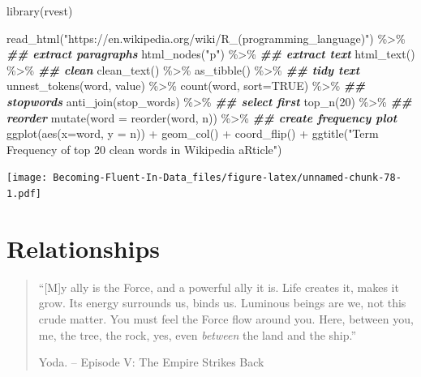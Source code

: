 \documentclass[
]{book}
\newenvironment{Shaded}{\begin{snugshade}}{\end{snugshade}}
\newcommand{\AttributeTok}[1]{\textcolor[rgb]{0.77,0.63,0.00}{#1}}
\newcommand{\ConstantTok}[1]{\textcolor[rgb]{0.00,0.00,0.00}{#1}}
\newcommand{\DecValTok}[1]{\textcolor[rgb]{0.00,0.00,0.81}{#1}}
\newcommand{\DocumentationTok}[1]{\textcolor[rgb]{0.56,0.35,0.01}{\textbf{\textit{#1}}}}
\newcommand{\FunctionTok}[1]{\textcolor[rgb]{0.00,0.00,0.00}{#1}}
\newcommand{\NormalTok}[1]{#1}
\newcommand{\SpecialCharTok}[1]{\textcolor[rgb]{0.00,0.00,0.00}{#1}}
\newcommand{\StringTok}[1]{\textcolor[rgb]{0.31,0.60,0.02}{#1}}
\begin{document}
\begin{Shaded}
\begin{Highlighting}[]
\FunctionTok{library}\NormalTok{(rvest)}

\FunctionTok{read\_html}\NormalTok{(}\StringTok{"https://en.wikipedia.org/wiki/R\_(programming\_language)"}\NormalTok{) }\SpecialCharTok{\%\textgreater{}\%}
  \DocumentationTok{\#\# extract paragraphs}
  \FunctionTok{html\_nodes}\NormalTok{(}\StringTok{"p"}\NormalTok{)  }\SpecialCharTok{\%\textgreater{}\%}
  \DocumentationTok{\#\# extract text}
  \FunctionTok{html\_text}\NormalTok{() }\SpecialCharTok{\%\textgreater{}\%}
  \DocumentationTok{\#\# clean}
  \FunctionTok{clean\_text}\NormalTok{() }\SpecialCharTok{\%\textgreater{}\%}
  \FunctionTok{as\_tibble}\NormalTok{() }\SpecialCharTok{\%\textgreater{}\%}
  \DocumentationTok{\#\# tidy text}
  \FunctionTok{unnest\_tokens}\NormalTok{(word, value) }\SpecialCharTok{\%\textgreater{}\%}
  \FunctionTok{count}\NormalTok{(word, }\AttributeTok{sort=}\ConstantTok{TRUE}\NormalTok{) }\SpecialCharTok{\%\textgreater{}\%}
  \DocumentationTok{\#\# stopwords}
  \FunctionTok{anti\_join}\NormalTok{(stop\_words) }\SpecialCharTok{\%\textgreater{}\%}
  \DocumentationTok{\#\# select first}
  \FunctionTok{top\_n}\NormalTok{(}\DecValTok{20}\NormalTok{) }\SpecialCharTok{\%\textgreater{}\%}
  \DocumentationTok{\#\# reorder}
  \FunctionTok{mutate}\NormalTok{(}\AttributeTok{word =} \FunctionTok{reorder}\NormalTok{(word, n)) }\SpecialCharTok{\%\textgreater{}\%}
  \DocumentationTok{\#\# create frequency plot }
  \FunctionTok{ggplot}\NormalTok{(}\FunctionTok{aes}\NormalTok{(}\AttributeTok{x=}\NormalTok{word, }\AttributeTok{y =}\NormalTok{ n)) }\SpecialCharTok{+}
  \FunctionTok{geom\_col}\NormalTok{() }\SpecialCharTok{+} \FunctionTok{coord\_flip}\NormalTok{() }\SpecialCharTok{+} 
  \FunctionTok{ggtitle}\NormalTok{(}\StringTok{"Term Frequency of top 20 clean words in Wikipedia aRticle"}\NormalTok{)}
\end{Highlighting}
\end{Shaded}

\texttt{[image: Becoming-Fluent-In-Data\_files/figure-latex/unnamed-chunk-78-1.pdf]}

\hypertarget{relationships}{%
\chapter{Relationships}\label{relationships}}

\begin{quote}
``{[}M{]}y ally is the Force, and a powerful ally it is. Life creates it, makes it grow. Its energy surrounds us, binds us. Luminous beings are we, not this crude matter. You must feel the Force flow around you. Here, between you, me, the tree, the rock, yes, even \emph{between} the land and the ship.''

\hfill Yoda. -- Episode V: The Empire Strikes Back
\end{quote}
\end{document}
